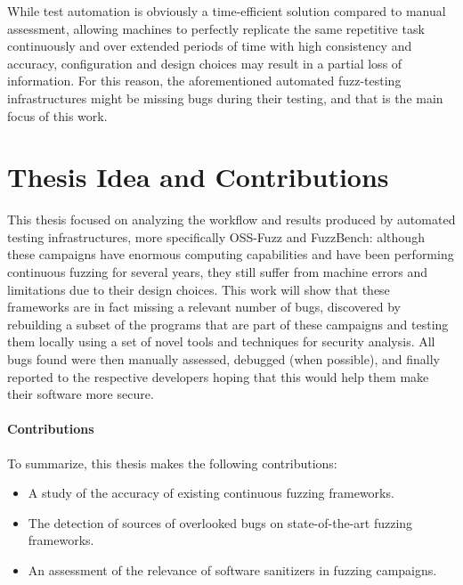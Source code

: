 While test automation is obviously a time-efficient solution compared to manual assessment, allowing machines to perfectly replicate the same repetitive task continuously and over extended periods of time with high consistency and accuracy, configuration and design choices may result in a partial loss of information. For this reason, the aforementioned automated fuzz-testing infrastructures might be missing bugs during their testing, and that is the main focus of this work.  




\section{Thesis Idea and Contributions}
This thesis focused on analyzing the workflow and results produced by automated testing infrastructures, more specifically OSS-Fuzz and FuzzBench: although these campaigns have enormous computing capabilities and have been performing continuous fuzzing for several years, they still suffer from machine errors and limitations due to their design choices. This work will show that these frameworks are in fact missing a relevant number of bugs, discovered by rebuilding a subset of the programs that are part of these campaigns and testing them locally using a set of novel tools and techniques for security analysis. All bugs found were then manually assessed, debugged (when possible), and finally reported to the respective developers hoping that this would help them make their software more secure.


\paragraph{Contributions}
To summarize, this thesis makes the following contributions:
\begin{itemize}
    \item A study of the accuracy of existing continuous fuzzing frameworks.
    \item The detection of sources of overlooked bugs on state-of-the-art fuzzing frameworks.
    \item An assessment of the relevance of software sanitizers in fuzzing campaigns.
\end{itemize}




